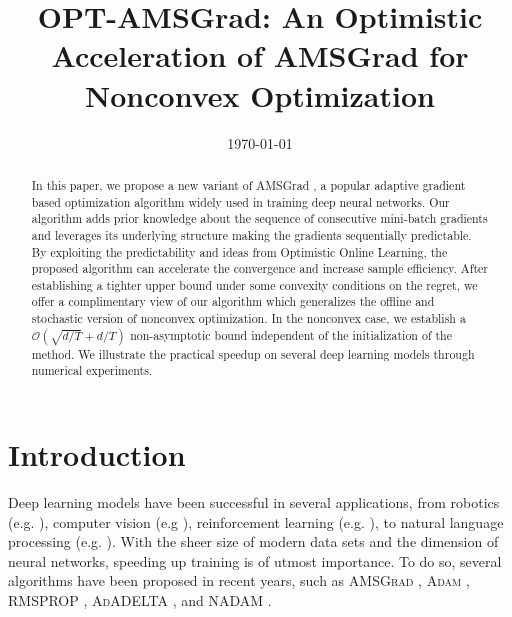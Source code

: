 \documentclass[11pt]{article}
\theoremstyle{k}
\begin{document}
\title{OPT-AMSGrad: An Optimistic Acceleration of AMSGrad for Nonconvex Optimization}
\date{\today}

\maketitle


\begin{abstract}
In this paper, we propose a new variant of AMSGrad \citep{RKK18}, a popular adaptive gradient based optimization algorithm widely used in training deep neural networks. 
Our algorithm adds prior knowledge about the sequence of consecutive mini-batch gradients and leverages its underlying structure making the gradients sequentially predictable. 
By exploiting the predictability and ideas from Optimistic Online Learning, the proposed algorithm can accelerate the convergence and increase sample efficiency.
After establishing a tighter upper bound under some convexity conditions on the regret, we offer a complimentary view of our algorithm which generalizes the offline and stochastic version of nonconvex optimization. 
In the nonconvex case, we establish a $\mathcal{O}\left(\sqrt{d/T} +d/T \right)$ non-asymptotic bound independent of the initialization of the method.
We illustrate the practical speedup on several deep learning models through numerical experiments.
\end{abstract}

\section{Introduction}

Deep learning models have been successful in several applications, from robotics (e.g. \citep{LFDA17}), computer vision (e.g \citep{Rnet16,goodfellow2014generative}), reinforcement learning (e.g. \citep{Atari13}), to natural language processing (e.g. \citep{GMH13}).
With the sheer size of modern data sets and the dimension of neural networks, speeding up training is of utmost importance.
To do so, several algorithms have been proposed in recent years, such as  \textsc{AMSGrad} \citep{RKK18}, \textsc{Adam} \citep{KB15}, \textsc{RMSPROP} \citep{TH12}, \textsc{AdADELTA} \citep{Z12}, and \textsc{NADAM} \citep{D16}.
\end{document}
